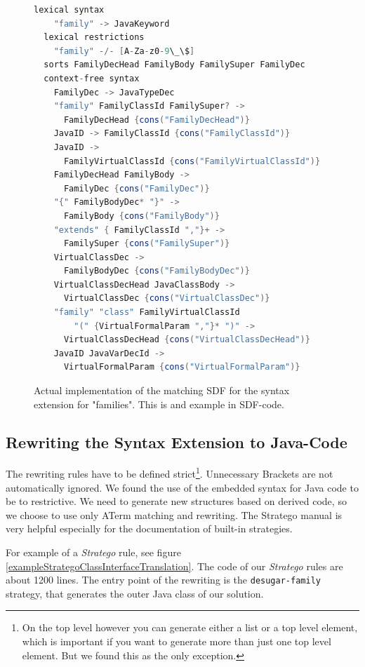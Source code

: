 \documentclass{report}
\begin{document}
\begin{figure}[H]
\begin{lstlisting}[language=java,breaklines=false]
  lexical syntax
    "family" -> JavaKeyword
  lexical restrictions
  	"family" -/- [A-Za-z0-9\_\$] 
  sorts FamilyDecHead FamilyBody FamilySuper FamilyDec
  context-free syntax
    FamilyDec -> JavaTypeDec
    "family" FamilyClassId FamilySuper? ->
      FamilyDecHead {cons("FamilyDecHead")}
    JavaID -> FamilyClassId {cons("FamilyClassId")}
    JavaID -> 
      FamilyVirtualClassId {cons("FamilyVirtualClassId")}
    FamilyDecHead FamilyBody ->
      FamilyDec {cons("FamilyDec")}
    "{" FamilyBodyDec* "}" ->
      FamilyBody {cons("FamilyBody")}
    "extends" { FamilyClassId ","}+ ->
      FamilySuper {cons("FamilySuper")}
    VirtualClassDec ->
      FamilyBodyDec {cons("FamilyBodyDec")}
    VirtualClassDecHead JavaClassBody ->
      VirtualClassDec {cons("VirtualClassDec")}
    "family" "class" FamilyVirtualClassId
        "(" {VirtualFormalParam ","}* ")" ->
      VirtualClassDecHead {cons("VirtualClassDecHead")}
    JavaID JavaVarDecId ->
      VirtualFormalParam {cons("VirtualFormalParam")}
\end{lstlisting}
\caption{Actual implementation of the matching SDF for the syntax extension for "families". This is and example in SDF-code.}
\label{sdfFamilies}
\end{figure}


\subsection{Rewriting the Syntax Extension to Java-Code}
The rewriting rules have to be defined strict\footnote{On the top level however you can generate either a list or a top level element, which is important if you want to generate more than just one top level element. But we found this as the only exception.}. Unnecessary Brackets are not automatically ignored. We found the use of the embedded syntax for Java code to be to restrictive. We need to generate new structures based on derived code, so we choose to use only ATerm matching and rewriting. The Stratego manual \cite{Stratego-Manual} is very helpful especially for the documentation of built-in strategies.

For example of a \emph{Stratego} rule, see figure \ref{exampleStrategoClassInterfaceTranslation}. The code of our \emph{Stratego} rules are about 1200 lines. The entry point of the rewriting is the \lstinline{desugar-family} strategy, that generates the outer Java class of our solution.
\end{document}
